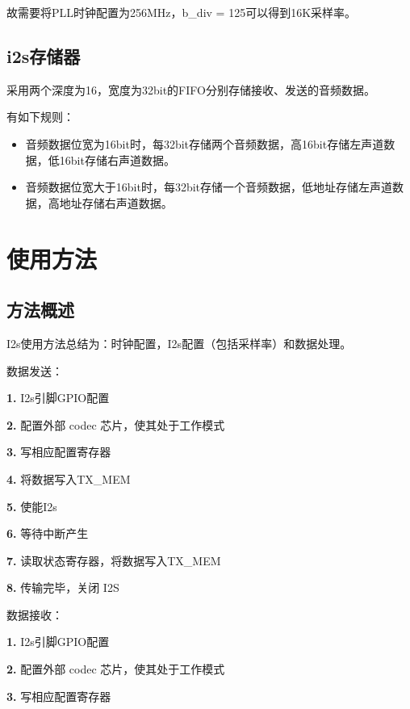 \documentclass[
  12pt,
]{book}
\begin{document}
故需要将PLL时钟配置为256MHz，b\_div = 125可以得到16K采样率。

\hypertarget{i2sux5b58ux50a8ux5668}{%
\subsection{i2s存储器}\label{i2sux5b58ux50a8ux5668}}

采用两个深度为16，宽度为32bit的FIFO分别存储接收、发送的音频数据。

有如下规则：

\begin{itemize}
\item
  音频数据位宽为16bit时，每32bit存储两个音频数据，高16bit存储左声道数据，低16bit存储右声道数据。
\item
  音频数据位宽大于16bit时，每32bit存储一个音频数据，低地址存储左声道数据，高地址存储右声道数据。
\end{itemize}

\hypertarget{ux4f7fux7528ux65b9ux6cd5-2}{%
\section{使用方法}\label{ux4f7fux7528ux65b9ux6cd5-2}}

\hypertarget{ux65b9ux6cd5ux6982ux8ff0-2}{%
\subsection{方法概述}\label{ux65b9ux6cd5ux6982ux8ff0-2}}

I2s使用方法总结为：时钟配置，I2s配置（包括采样率）和数据处理。

数据发送：

\textbf{1.} I2s引脚GPIO配置

\textbf{2.} 配置外部 codec 芯片，使其处于工作模式

\textbf{3.} 写相应配置寄存器

\textbf{4.} 将数据写入TX\_MEM

\textbf{5.} 使能I2s

\textbf{6.} 等待中断产生

\textbf{7.} 读取状态寄存器，将数据写入TX\_MEM

\textbf{8.} 传输完毕，关闭 I2S

数据接收：

\textbf{1.} I2s引脚GPIO配置

\textbf{2.} 配置外部 codec 芯片，使其处于工作模式

\textbf{3.} 写相应配置寄存器
\end{document}
